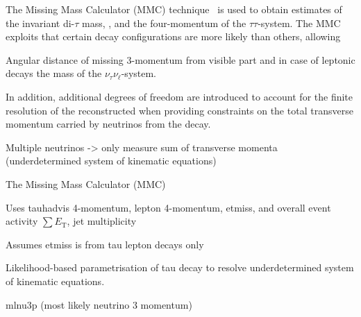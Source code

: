 The Missing Mass Calculator (MMC) technique~\cite{Elagin:2010aw} is
used to obtain estimates of the invariant di-$\tau$ mass, \mMMC, and
the four-momentum of the $\tau\tau$-system. The MMC exploits that
certain \taulepton decay configurations are more likely than others,
allowing

Angular distance of missing 3-momentum from visible part and in case
of leptonic decays the mass of the $\nu_\tau\nu_\ell$-system.

In addition, additional degrees of freedom are introduced to account
for the finite resolution of the reconstructed \pTmiss when providing
constraints on the total transverse momentum carried by neutrinos from
the \taulepton decay.

Multiple neutrinos -> only measure sum of transverse momenta
(underdetermined system of kinematic equations)

The Missing Mass Calculator (MMC)

Uses tauhadvis 4-momentum, lepton 4-momentum, etmiss, and overall
event activity $\sum E_{\text{T}}$, jet multiplicity

Assumes etmiss is from tau lepton decays only


Likelihood-based parametrisation of tau decay to resolve
underdetermined system of kinematic equations.

mlnu3p (most likely neutrino 3 momentum)



%





